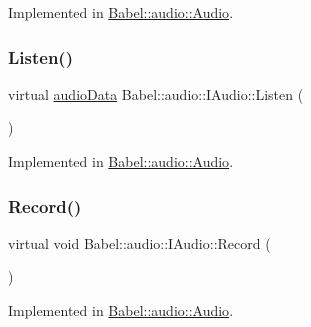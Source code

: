 Implemented in \hyperlink{classBabel_1_1audio_1_1Audio_ae05b545cad9e1db811dc3a27bb7fd7d8}{Babel\+::audio\+::\+Audio}.

\mbox{\label{classBabel_1_1audio_1_1IAudio_a2b7c300088982a040edc5f9f203c94df}} 
\subsubsection{\texorpdfstring{Listen()}{Listen()}}
{\footnotesize\ttfamily virtual \hyperlink{structaudioData}{audio\+Data} Babel\+::audio\+::\+I\+Audio\+::\+Listen (\begin{DoxyParamCaption}{ }\end{DoxyParamCaption})\hspace{0.3cm}{\ttfamily [pure virtual]}}



Implemented in \hyperlink{classBabel_1_1audio_1_1Audio_a002b91e9a4c7806f4e29fd2943a11918}{Babel\+::audio\+::\+Audio}.

\mbox{\label{classBabel_1_1audio_1_1IAudio_a35c021d9d38ffeeec1aa8c6890e30151}} 
\subsubsection{\texorpdfstring{Record()}{Record()}}
{\footnotesize\ttfamily virtual void Babel\+::audio\+::\+I\+Audio\+::\+Record (\begin{DoxyParamCaption}{ }\end{DoxyParamCaption})\hspace{0.3cm}{\ttfamily [pure virtual]}}



Implemented in \hyperlink{classBabel_1_1audio_1_1Audio_a5a3398e6f3dc876748d6c35f2b8cf437}{Babel\+::audio\+::\+Audio}.

\mbox{\label{classBabel_1_1audio_1_1IAudio_a879bde00b067128659a6108a883a10f7}} 
